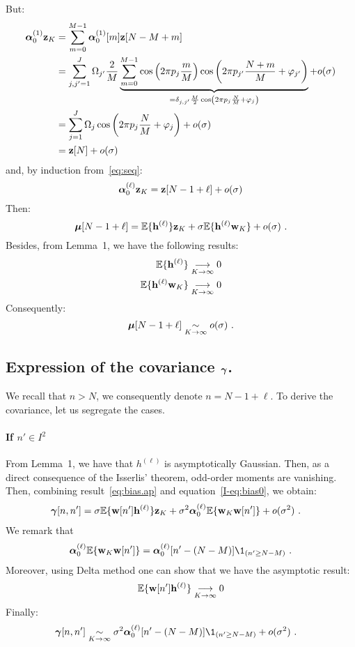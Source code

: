 \documentclass[journal,onecolumn]{IEEEtran}
\begin{document}
But:
\begin{align*}
\boldsymbol{\alpha}_0^{(1)}{\mathbf z}_{K} &=\sum_{m=0}^{M-1}\boldsymbol{\alpha}_0^{(1)}[m]{\mathbf z}[N-M+m] \\
&=\sum_{j,j'=1}^J\Omega_{j'}\dfrac{2}{M}\underbrace{\sum_{m=0}^{M-1}\cos\left(2\pi p_j\frac{m}{M}\right)\cos\left(2\pi p_{j'}\dfrac{N+m}{M}+\varphi_{j'}\right)}_{=\delta_{j,j'}\frac{M}2\cos\left(2\pi p_j\frac{N}M +\varphi_{j}\right)} + o(\sigma) \\
&= \sum_{j=1}^J\Omega_j\cos\left(2\pi p_j\dfrac{N}{M}+\varphi_j\right) + o(\sigma) \\
&= {\mathbf z}[N] + o(\sigma)
\end{align*}
and, by induction from~\eqref{eq:seq}:
\begin{equation}
\label{eq:alpha0z.sine}
\balpha_0^{(\ell)}\bz_{K} = \bz[N-1+\ell] + o(\sigma)
\end{equation}
Then:
\begin{equation*}
\boldsymbol{\mu}[N-1+\ell] = {\mathbb E}\{{\mathbf h}^{(\ell)}\}{\mathbf z}_{K} + \sigma{\mathbb E}\{{\mathbf h}^{(\ell)}{\mathbf w}_{K}\} + o(\sigma)\ .
\end{equation*}
Besides, from Lemma~1, we have the following results:
\begin{align*}
{\mathbb E}\{{\mathbf h}^{(\ell)}\} &\underset{K\to\infty}{\longrightarrow} 0\\
{\mathbb E}\{{\mathbf h}^{(\ell)}{\mathbf w}_{K}\} &\underset{K\to\infty}{\longrightarrow} 0
\end{align*}
Consequently:
\begin{equation}
\bmu[N-1+\ell] \underset{K\to\infty}{\sim} o(\sigma)\ .
\label{eq:bias.ap}
\end{equation}


\subsection{Expression of the covariance $\boldsymbol{\gamma}$.}
We recall that $n>N$, we consequently denote $n=N-1+\ell$.  To derive the covariance, let us segregate the cases. 
 
\paragraph{If $n'\in I^2$}
From Lemma~1, we have that $h^{(\ell)}$ is asymptotically Gaussian. Then, as a direct consequence of the Isserlis' theorem, odd-order moments are vanishing. Then, combining result~\eqref{eq:bias.ap} and equation~\eqref{I-eq:bias0}, we obtain:
\begin{align*}
\boldsymbol{\gamma}[n,n'] &= \sigma{\mathbb E}\{{\mathbf w}[n']{\mathbf h}^{(\ell)}\}{\mathbf z}_K + \sigma^2\boldsymbol{\alpha}_0^{(\ell)}{\mathbb E}\{{\mathbf w}_K{\mathbf w}[n']\} + o(\sigma^2) \ .
\end{align*}
We remark that
\[
\balpha_0^{(\ell)}\EE\{\bw_K\bw[n']\}=\balpha_0^{(\ell)}[n'-(N-M)]\1_{(n'\geq N-M)}\ .
\]
Moreover, using Delta method one can show that we have the asymptotic result:
\begin{equation}
\EE\{\bw[n']\bh^{(\ell)}\} \underset{K\to\infty}{\longrightarrow} 0
\label{eq:cov.ap}
\end{equation}
Finally:
\begin{align*}
\bgamma[n,n'] &\underset{K\to\infty}{\sim} \sigma^2\balpha_0^{(\ell)}[n'-(N-M)]\1_{(n'\geq N-M)} + o(\sigma^2) \ .
\end{align*}
\end{document}
